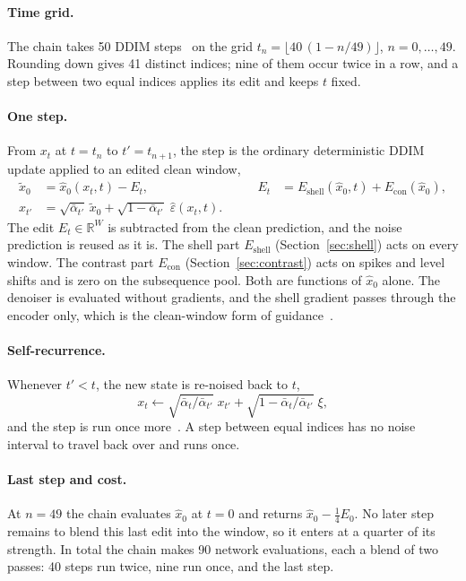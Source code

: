 \documentclass[11pt,a4paper]{article}
\newcommand{\R}{\mathbb{R}}
\newcommand{\xhat}{\hat{x}_{0}}            %
\newcommand{\xtil}{\tilde{x}_{0}}          %
\newcommand{\ehat}{\hat{\varepsilon}}      %
\newcommand{\abar}{\bar\alpha}
\newcommand{\Eshell}{E_{\mathrm{shell}}}
\newcommand{\Econ}{E_{\mathrm{con}}}
\begin{document}
\paragraph{Time grid.}
The chain takes 50 DDIM steps~\cite{song2021ddim} on the grid
$t_{n} = \lfloor 40\,(1 - n/49) \rfloor$, $n = 0, \ldots, 49$. Rounding down
gives 41 distinct indices; nine of them occur twice in a row, and a step
between two equal indices applies its edit and keeps $t$ fixed.

\paragraph{One step.}
From $x_{t}$ at $t = t_{n}$ to $t' = t_{n+1}$, the step is the ordinary
deterministic DDIM update applied to an edited clean window,
\begin{equation}
\label{eq:ddim}
\begin{aligned}
\xtil &= \xhat(x_{t}, t) - E_{t},
&\qquad
E_{t} &= \Eshell(\xhat, t) + \Econ(\xhat), \\
x_{t'} &= \sqrt{\abar_{t'}}\,\xtil + \sqrt{1 - \abar_{t'}}\;\ehat(x_{t}, t).
\end{aligned}
\end{equation}
The edit $E_{t} \in \R^{W}$ is subtracted from the clean prediction, and the
noise prediction is reused as it is. The shell part $\Eshell$
(Section~\ref{sec:shell}) acts on every window. The contrast part $\Econ$
(Section~\ref{sec:contrast}) acts on spikes and level shifts and is zero on
the subsequence pool. Both are functions of $\xhat$ alone. The denoiser is
evaluated without gradients, and the shell gradient passes through the encoder
only, which is the clean-window form of guidance~\cite{bansal2023universal}.

\paragraph{Self-recurrence.}
Whenever $t' < t$, the new state is re-noised back to $t$,
\begin{equation}
\label{eq:recur}
x_{t} \leftarrow \sqrt{\abar_{t}/\abar_{t'}}\;x_{t'}
  + \sqrt{1 - \abar_{t}/\abar_{t'}}\;\xi,
\end{equation}
and the step is run once more~\cite{bansal2023universal}. A step between equal
indices has no noise interval to travel back over and runs once.

\paragraph{Last step and cost.}
At $n = 49$ the chain evaluates $\xhat$ at $t = 0$ and returns
$\xhat - \tfrac{1}{4} E_{0}$. No later step remains to blend this last edit
into the window, so it enters at a quarter of its strength. In total the chain
makes 90 network evaluations, each a blend of two passes: 40 steps run twice,
nine run once, and the last step.
\end{document}

